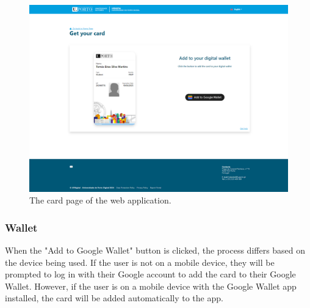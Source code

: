 \documentclass[12pt]{article}
\begin{document}
\begin{figure}[H]
	\centering
	\includegraphics[width=\textwidth]{card_page.png}
	\caption{The card page of the web application.}
\end{figure}

\subsubsection{Wallet}
When the "Add to Google Wallet" button is clicked, the process differs based on the
device being used. If the user is not on a mobile device, they will be prompted to
log in with their Google account to add the card to their Google Wallet. However,
if the user is on a mobile device with the Google Wallet app installed, the card
will be added automatically to the app.
\end{document}
